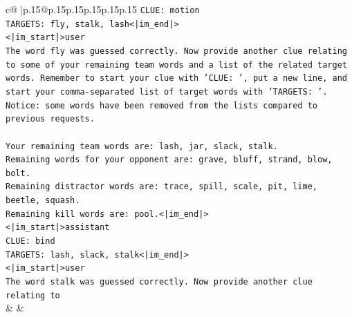 \documentclass{article}
\begin{document}
{\begin{supertabular}{c@{$\;$}|p{.15\linewidth}@{}p{.15\linewidth}p{.15\linewidth}p{.15\linewidth}p{.15\linewidth}p{.15\linewidth}}
{{{\texttt{CLUE: motion} \\
\texttt{TARGETS: fly, stalk, lash<|im\_end|>} \\
\texttt{<|im\_start|>user} \\
\texttt{The word fly was guessed correctly. Now provide another clue relating to some of your remaining team words and a list of the related target words. Remember to start your clue with 'CLUE: ', put a new line, and start your comma{-}separated list of target words with 'TARGETS: '. Notice: some words have been removed from the lists compared to previous requests.} \\
\\ 
\texttt{Your remaining team words are: lash, jar, slack, stalk.} \\
\texttt{Remaining words for your opponent are: grave, bluff, strand, blow, bolt.} \\
\texttt{Remaining distractor words are: trace, spill, scale, pit, lime, beetle, squash.} \\
\texttt{Remaining kill words are: pool.<|im\_end|>} \\
\texttt{<|im\_start|>assistant} \\
\texttt{CLUE: bind} \\
\texttt{TARGETS: lash, slack, stalk<|im\_end|>} \\
\texttt{<|im\_start|>user} \\
\texttt{The word stalk was guessed correctly. Now provide another clue relating to} \\
            }
        }
    }
    & & \\ \\


\end{supertabular}}
\end{document}
